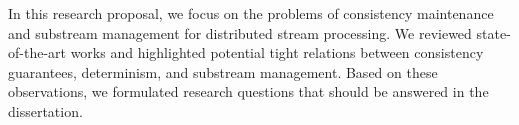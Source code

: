 In this research proposal, we focus on the problems of consistency maintenance and substream management for distributed stream processing. We reviewed state-of-the-art works and highlighted potential tight relations between consistency guarantees, determinism, and substream management. Based on these observations, we formulated research questions that should be answered in the dissertation.
